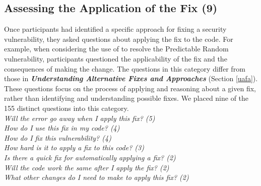 \documentclass[conference]{IEEEtran}
\begin{document}



\noindent\subsection{\textbf{Assessing the Application of the Fix (9)}}\label{aaf}
Once participants had identified a specific approach for fixing a security vulnerability, they asked questions about applying the fix to the code.
For example, when considering the use of  to resolve the Predictable Random vulnerability, participants questioned the applicability of the fix and the consequences of making the change. 
The questions in this category differ from those in \emph{\textbf{Understanding Alternative Fixes and Approaches}} (Section \ref{uafa}). 
These questions focus on the process of applying  and reasoning about a given fix, rather than identifying and understanding possible fixes.
We placed nine of the 155 distinct questions into this category.
\\

\noindent\emph{Will the error go away when I apply this fix? (5)} \\
\emph{How do I use this fix in my code? (4)} \\
\emph{How do I fix this vulnerability? (4)} \\
\emph{How hard is it to apply a fix to this code? (3)} \\
\emph{Is there a quick fix for automatically applying a fix? (2)} \\
\emph{Will the code work the same after I apply the fix? (2)} \\
\emph{What other changes do I need to make to apply this fix? (2)} \\
\end{document}
